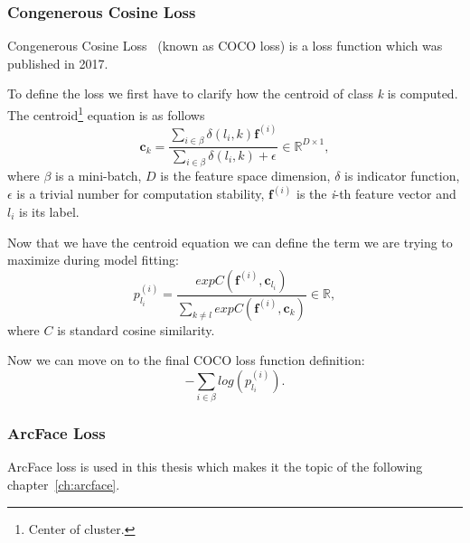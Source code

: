 \subsubsection{Congenerous Cosine Loss}
Congenerous Cosine Loss~\cite{CocoLoss} (known as COCO loss) is a loss function which was published in 2017.

To define the loss we first have to clarify how the centroid of class \textit{k} is computed.
The centroid\footnote{Center of cluster.} equation is as follows
\begin{equation}
    \boldsymbol{c}_{k} = \frac{\sum_{i \in \beta} \delta \left( l_i, k \right)\boldsymbol{f}^{(i)}}
    {\sum_{i \in \beta} \delta \left( l_i, k \right) + \epsilon} \in \mathbb{R}^{D \times 1},
\end{equation}
where $\beta$ is a mini-batch, $D$ is the feature space dimension, $\delta$ is indicator function, $\epsilon$ is a
trivial number for computation stability, $\boldsymbol{f}^{(i)}$ is the \textit{i}-th feature vector and $l_i$ is
its label.

Now that we have the centroid equation we can define the term we are trying to maximize during model fitting:
\begin{equation}
    p_{l_i}^{(i)} = \frac{exp C(\boldsymbol{f}^{(i)}, \boldsymbol{c}_{l_{i}})}
    {\sum_{k \neq l} exp C(\boldsymbol{f}^{(i)}, \boldsymbol{c}_{k})} \in \mathbb{R},
\end{equation}
where $C$ is standard cosine similarity.

Now we can move on to the final COCO loss function definition:
\begin{equation}
    - \sum_{i \in \beta} log \left( p_{l_i}^{(i)} \right).
\end{equation}


\subsubsection{ArcFace Loss}\label{subsubsec:arcface}
ArcFace loss is used in this thesis which makes it the topic of the following chapter~\ref{ch:arcface}.